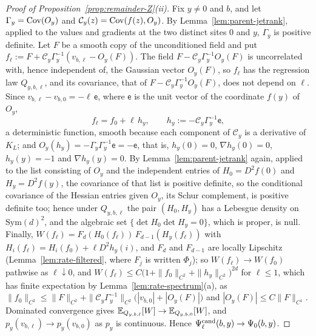\begin{proof}[Proof of Proposition~\ref{prop:remainder-Z}(ii)]
Fix $y\ne0$ and $b$, and let $\Gamma_y=\operatorname{Cov}(O_y)$ and $\mathcal C_y(z)=\operatorname{Cov}(f(z),O_y)$. By Lemma~\ref{lem:parent-jetrank}, applied to the values and gradients at the two distinct sites $0$ and $y$, $\Gamma_y$ is positive definite. Let $F$ be a smooth copy of the unconditioned field and put $f_\ell:=F+\mathcal C_y\Gamma_y^{-1}(v_{b,\ell}-O_y(F))$. The field $F-\mathcal C_y\Gamma_y^{-1}O_y(F)$ is uncorrelated with, hence independent of, the Gaussian vector $O_y(F)$, so $f_\ell$ has the regression law $Q_{y,b,\ell}$, and its covariance, that of $F-\mathcal C_y\Gamma_y^{-1}O_y(F)$, does not depend on $\ell$. Since $v_{b,\ell}-v_{b,0}=-\ell\,\mathsf e$, where $\mathsf e$ is the unit vector of the coordinate $f(y)$ of $O_y$,
\[
f_\ell=f_0+\ell\,h_y,\qquad h_y:=-\mathcal C_y\Gamma_y^{-1}\mathsf e,
\]
a deterministic function, smooth because each component of $\mathcal C_y$ is a derivative of $K_L$; and $O_y(h_y)=-\Gamma_y\Gamma_y^{-1}\mathsf e=-\mathsf e$, that is, $h_y(0)=0$, $\nabla h_y(0)=0$, $h_y(y)=-1$ and $\nabla h_y(y)=0$. By Lemma~\ref{lem:parent-jetrank} again, applied to the list consisting of $O_y$ and the independent entries of $H_0=D^2f(0)$ and $H_y=D^2f(y)$, the covariance of that list is positive definite, so the conditional covariance of the Hessian entries given $O_y$, its Schur complement, is positive definite too; hence under $Q_{y,b,\ell}$ the pair $(H_0,H_y)$ has a Lebesgue density on $\mathrm{Sym}(d)^2$, and the algebraic set $\{\det H_0\det H_y=0\}$, which is proper, is null. Finally, $W(f_\ell)=F_d(H_0(f_\ell))\,F_{d-1}(H_y(f_\ell))$ with $H_i(f_\ell)=H_i(f_0)+\ell D^2h_y(i)$, and $F_d$ and $F_{d-1}$ are locally Lipschitz (Lemma~\ref{lem:rate-filtered}, where $F_j$ is written $\Phi_j$); so $W(f_\ell)\to W(f_0)$ pathwise as $\ell\downarrow0$, and $W(f_\ell)\le C\bigl(1+\|f_0\|_{C^2}+\|h_y\|_{C^2}\bigr)^{2d}$ for $\ell\le1$, which has finite expectation by Lemma~\ref{lem:rate-spectrum}(a), as $\|f_0\|_{C^2}\le\|F\|_{C^2}+\|\mathcal C_y\Gamma_y^{-1}\|_{C^2}\bigl(|v_{b,0}|+|O_y(F)|\bigr)$ and $|O_y(F)|\le C\|F\|_{C^1}$. Dominated convergence gives $\mathbb E_{Q_{y,b,\ell}}[W]\to\mathbb E_{Q_{y,b,0}}[W]$, and $p_y(v_{b,\ell})\to p_y(v_{b,0})$ as $p_y$ is continuous. Hence $\Psi^{\mathrm{cand}}_\ell(b,y)\to\Psi_0(b,y)$.
\end{proof}


